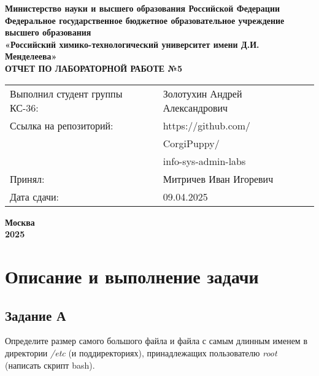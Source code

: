 \documentclass[12pt, a4paper]{report}
\begin{document}
	\begin{titlepage}
			\begin{center}
				\large \textbf{Министерство науки и высшего образования Российской Федерации} \\
				\large \textbf{Федеральное государственное бюджетное образовательное учреждение высшего образования} \\
				\large \textbf{«Российский химико-технологический университет имени Д.И. Менделеева»} \\

				\vspace*{4cm}
				\LARGE \textbf{ОТЧЕТ ПО ЛАБОРАТОРНОЙ РАБОТЕ №5}

				\vspace*{4cm}
				\begin{flushright}
					\Large
					\begin{tabular}{>{\raggedleft\arraybackslash}p{8.85cm} p{10.8cm}}
						Выполнил студент группы КС-36: & Золотухин Андрей Александрович \\
						Ссылка на репозиторий: & https://github.com/ \\ 
						& CorgiPuppy/ \\
						& info-sys-admin-labs \\
						Принял: & Митричев Иван Игоревич \\
						Дата сдачи: & 09.04.2025 \\
					\end{tabular}

				\end{flushright}

				\vspace*{6cm}
				\Large \textbf{Москва \\ 2025}
			\end{center}
		\end{titlepage}
		
		\tableofcontents	
		\thispagestyle{empty}
		\newpage

		
		\section*{Описание и выполнение задачи}
		\large
		
		\subsection*{Задание А}
		Определите размер самого большого файла и файла с самым длинным именем в директории \textit{/etc} (и поддиректориях), принадлежащих пользователю \textit{root} (написать скрипт bash).
\end{document}
